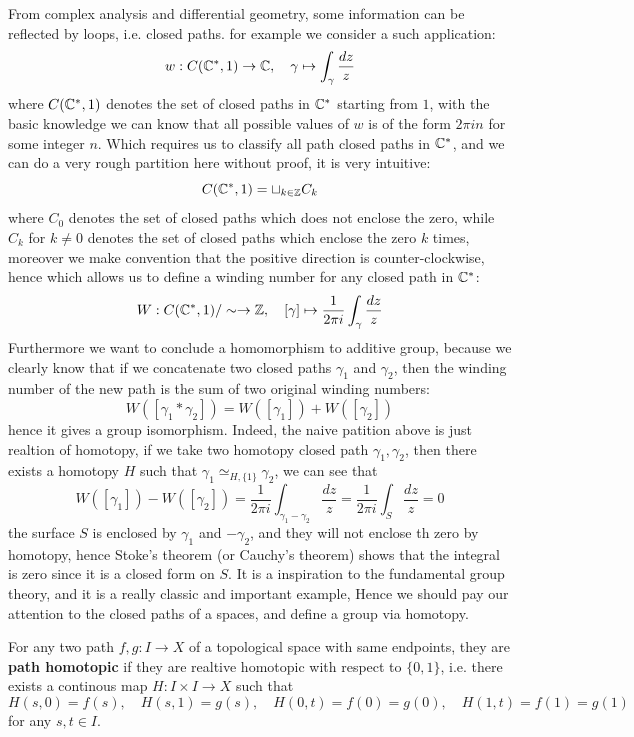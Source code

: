 \documentclass[12pt,a4paper]{article}
\begin{document}
From complex analysis and differential geometry, some information can be reflected by loops, i.e. closed paths. for example we consider a such application:
\[w: C(\mathbb{C}^*,1) \to \mathbb{C}, \quad \gamma \mapsto \int_{\gamma}\frac{dz}{z}\]
where \(C(\mathbb{C}^*,1)\) denotes the set of closed paths in \(\mathbb{C}^*\) starting from \(1\), with the basic knowledge we can know that all possible values of \(w\) is of the form \(2\pi i n\) for some integer \(n\). Which requires us to classify all path closed paths in \(\mathbb{C}^*\), and we can do a very rough partition here without proof, it is very intuitive:
\[C(\mathbb{C}^*,1) = \sqcup_{k \in \mathbb{Z}}C_k\]
where \(C_0\) denotes the set of closed paths which does not enclose the zero, while \(C_k\) for \(k \neq 0\) denotes the set of closed paths which enclose the zero \(k\) times, moreover we make convention that the positive direction is counter-clockwise, hence which allows us to define a winding number for any closed path in \(\mathbb{C}^*\):
\[W:C(\mathbb{C}^*,1)/\sim \to \mathbb{Z}, \quad [\gamma] \mapsto \frac{1}{2 \pi i}\int_{\gamma}\frac{dz}{z} \]
Furthermore we want to conclude a homomorphism to additive group, because we clearly know that if we concatenate two closed paths \(\gamma_1\) and \(\gamma_2\), then the winding number of the new path is the sum of two original winding numbers:
\[W([\gamma_1 * \gamma_2]) = W([\gamma_1]) + W([\gamma_2])\]
hence it gives a group isomorphism. Indeed, the naive patition above is just realtion of homotopy, if we take two homotopy closed path \(\gamma_1,\gamma_2\), then there exists a homotopy \(H\) such that \(\gamma_1 \simeq_{H,\{1\}} \gamma_2\), we can see that
\[W([\gamma_1])-W([\gamma_2]) = \frac{1}{2\pi i }\int_{\gamma_1 - \gamma_2}\frac{dz}{z} = \frac{1}{2 \pi i }\int_S \frac{dz}{z} = 0\]
the surface \(S\) is enclosed by \(\gamma_1\) and \(-\gamma_2\), and they will not enclose th zero by homotopy, hence Stoke's theorem (or Cauchy's theorem) shows that the integral is zero since it is a closed form on \(S\). It is a inspiration to the fundamental group theory, and it is a really classic and important example, Hence we should pay our attention to the closed paths of a spaces, and define a group via homotopy.

\begin{definitionplain}
    For any two path \(f,g:I \to X\) of a topological space with same endpoints, they are \textbf{path homotopic} if they are realtive homotopic with respect to \(\{0,1\}\), i.e. there exists a continous map \(H:I \times I \to X\) such that
    \[H(s,0) = f(s), \quad H(s,1) = g(s), \quad H(0,t) = f(0) = g(0), \quad H(1,t) = f(1) = g(1)\]
    for any \(s,t \in I\). 
\end{definitionplain}
\end{document}

